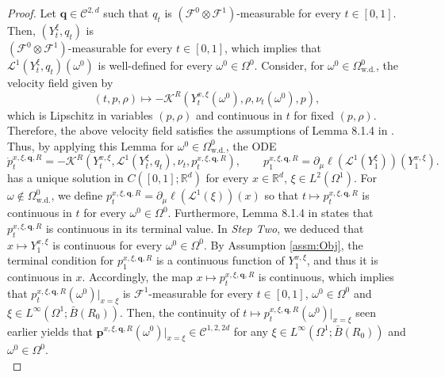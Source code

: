 \documentclass{article}
\newcommand{\R}{\mathbb{R}}
\begin{document}
\begin{appendices}
\begin{proof}
Let $\bm{q}\in \mathscr{C}^{2,d}$ such that $q_t$ is $(\mathcal F^0\otimes \mathcal F^1)$-measurable for every $t\in[0,1]$. Then, $(Y_t^\xi,q_t)$ is \\$(\mathcal F^0\otimes \mathcal F^1)$-measurable for every $t\in[0,1]$, which implies that $\mathcal L^1(Y^{\xi}_t,q_t)(\omega^0)$ is well-defined for every $\omega^0\in \Omega^0$. Consider, for
$\omega^0\in \Omega^0_\mathrm{w.d.}$, the velocity field given by
\[
(t,p,\rho)\mapsto- \mathcal K^R(Y^{x,\xi}_t(\omega^0),\rho, \nu_t(\omega^0),p),
\]
which is Lipschitz in variables $(p,\rho)$ and continuous in $t$ for fixed $(p,\rho)$. Therefore, the above velocity field satisfies the assumptions of Lemma 8.1.4 in \cite{Ambrosio2008}. Thus, by applying this Lemma for $\omega^0\in\Omega^0_\mathrm{w.d.}$, 
the ODE
\begin{equation}\label{eqn:FlowMapP}
    \dot{p}^{x,\xi,\bm{q}, R}_t = -\mathcal K^R(Y^{x,\xi}_t,\mathcal L^1(Y^{\xi}_t,q_t), \nu_t,p^{x,\xi,\bm{q}, R}_t), \qquad p^{x,\xi,\bm{q},R}_1 = \partial_\mu\ell(\mathcal L^1(Y^{\xi}_1))(Y^{x,\xi}_1).
\end{equation}
has a unique solution in $C([0,1];\R^d)$ for every $x\in \R^d$, $\xi \in L^2(\Omega^1)$. For $\omega\notin \Omega^0_\mathrm{w.d.}$, we define $p^{x,\xi,\bm{q},R}_t=\partial_\mu\ell(\mathcal L^1(\xi))(x)$ so that $t\mapsto p_t^{x,\xi,\bm{q},R}$ is continuous in $t$ for every $\omega^0\in \Omega^0$. Furthermore, Lemma 8.1.4 in \cite{Ambrosio2008} states that $p^{x,\xi,\bm{q},R}_t$ is continuous in its terminal value. In \textit{Step Two}, we deduced that $x\mapsto Y^{x,\xi}_1$ is continuous for every $\omega^0\in \Omega^0$. By Assumption \ref{assm:Obj}, the terminal condition for $p_1^{x,\xi,\bm q,R}$ is a continuous function of $Y^{x,\xi}_1$, and thus it is continuous in $x$. Accordingly, the map $x\mapsto p^{x,\xi,\bm{q},R}_t$ is continuous, which implies that $p_t^{x,\xi,\bm q,R}(\omega^0)|_{x=\xi}$ is $\mathcal F^1$-measurable for every $t\in[0,1]$, $\omega^0\in \Omega^0$ and $\xi \in L^\infty(\Omega^1;\bar B(R_0))$. Then, the continuity of $t\mapsto p_t^{x,\xi,\bm q,R}(\omega^0)|_{x=\xi}$ seen earlier yields that $\bm p^{x,\xi,\bm q,R}(\omega^0)|_{x=\xi}\in \mathscr{C}^{1,2,2d}$ for any $\xi \in L^\infty(\Omega^1; \bar B(R_0))$ and $\omega^0\in \Omega^0$. \\


\end{proof}
\end{appendices}
\end{document}
